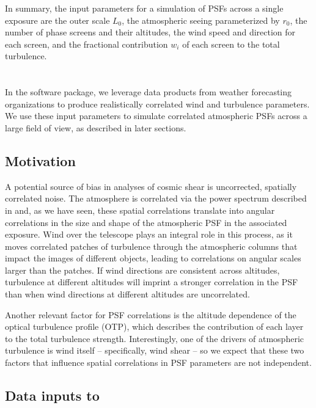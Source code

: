 \documentclass[twocolumn]{aastex631}
\begin{document}
In summary, the input parameters for a simulation of PSFs across a single exposure are the outer scale $L_0$, the atmospheric seeing parameterized by $r_0$, the number of phase screens and their altitudes, the wind speed and direction for each screen, and the fractional contribution $w_i$ of each screen to the total turbulence. 

\section{\psfws} \label{sec:psfws}

In the \psfws software package, we leverage data products from weather forecasting organizations to produce realistically correlated wind and turbulence parameters. 
We use these input parameters to simulate correlated atmospheric PSFs across a large field of view, as described in later sections. 

\subsection{Motivation}
A potential source of bias in analyses of cosmic shear is uncorrected, spatially correlated noise. 
The atmosphere is correlated via the \vk power spectrum described in  and, as we have seen, these spatial correlations translate into angular correlations in the size and shape of the atmospheric PSF in the associated exposure.
Wind over the telescope plays an integral role in this process, as it moves correlated patches of turbulence through the atmospheric columns that  impact the images of different objects, leading to correlations on angular scales larger than the patches. 
If wind directions are consistent across altitudes, turbulence at different altitudes will imprint a stronger correlation in the PSF than when wind directions at different altitudes are uncorrelated. 

Another relevant factor for PSF correlations is the altitude dependence of the optical turbulence profile (OTP), which describes the contribution of each layer to the total turbulence strength.
Interestingly, one of the drivers of atmospheric turbulence is wind itself -- specifically, wind shear -- so we expect that these two factors that influence spatial correlations in PSF parameters are not independent.


\subsection{Data inputs to \psfws} \label{sec:inputs}
\end{document}
